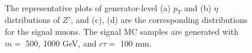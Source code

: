 \begin{figure}[!htb]
    \centering
     \\
    \caption{The representative plots of generator-level (a) $p_{T}$ and (b) $\eta$ distributions of $Z'$, and (c), (d) are the corresponding distributions for the signal muons. The signal MC samples are generated with $m=$ 500, 1000 GeV, and $c\tau=$ 100 mm.}
    \label{fig:truth_zp_muon}
\end{figure}


